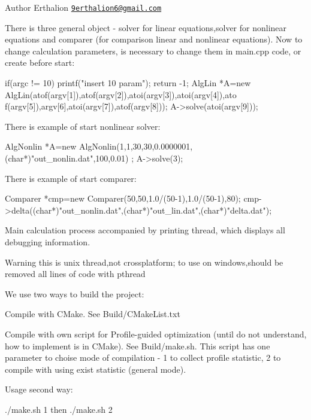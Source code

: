 \begin{DoxyAuthor}{Author}
Erthalion \href{mailto:9erthalion6@gmail.com}{\tt 9erthalion6@gmail.com}
\end{DoxyAuthor}
There is three general object -\/ solver for linear equations,solver for nonlinear equations and comparer (for comparison linear and nonlinear equations). Now to change calculation parameters, is necessary to change them in main.cpp code, or create before start: 
\begin{DoxyCode}
 if(argc != 10)
   {
       printf("insert 10 param\n");
       return -1;
   }
 AlgLin *A=new AlgLin(atof(argv[1]),atof(argv[2]),atoi(argv[3]),atoi(argv[4]),ato
      f(argv[5]),argv[6],atoi(argv[7]),atof(argv[8]));
 A->solve(atoi(argv[9]));
\end{DoxyCode}


There is example of start nonlinear solver: 
\begin{DoxyCode}
 AlgNonlin *A=new AlgNonlin(1,1,30,30,0.0000001,(char*)"out_nonlin.dat",100,0.01)
      ;
 A->solve(3);
\end{DoxyCode}


There is example of start comparer: 
\begin{DoxyCode}
 Comparer *cmp=new Comparer(50,50,1.0/(50-1),1.0/(50-1),80);
 cmp->delta((char*)"out_nonlin.dat",(char*)"out_lin.dat",(char*)"delta.dat");
\end{DoxyCode}


Main calculation process accompanied by printing thread, which displays all debugging information.

\begin{DoxyWarning}{Warning}
this is unix thread,not crossplatform; to use on windows,should be removed all lines of code with pthread
\end{DoxyWarning}
We use two ways to build the project: 
\begin{DoxyItemize}
\item Compile with CMake. See Build/CMakeList.txt 
\item Compile with own script for Profile-\/guided optimization (until do not understand, how to implement is in CMake). See Build/make.sh. This script has one parameter to choise mode of compilation -\/ 1 to collect profile statistic, 2 to compile with using exist statistic (general mode). 
\end{DoxyItemize}Usage second way: 
\begin{DoxyCode}
 ./make.sh 1
 then
 ./make.sh 2
\end{DoxyCode}


